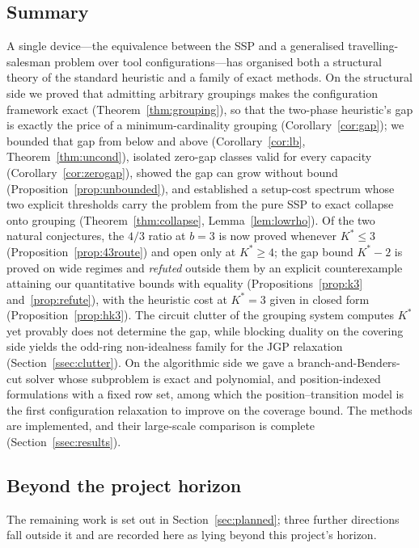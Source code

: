 \documentclass[11pt,a4paper]{article}
\theoremstyle{plain}
\theoremstyle{definition}
\theoremstyle{remark}
\newcommand{\Kst}{K^{\ast}}
\begin{document}
\subsection{Summary}
A single device---the equivalence between the SSP and a generalised
travelling-salesman problem over tool configurations---has organised both a
structural theory of the standard heuristic and a family of exact methods. On the
structural side we proved that admitting arbitrary groupings makes the configuration
framework exact (Theorem~\ref{thm:grouping}), so that the two-phase heuristic's gap is
exactly the price of a minimum-cardinality grouping (Corollary~\ref{cor:gap}); we
bounded that gap from below and above (Corollary~\ref{cor:lb},
Theorem~\ref{thm:uncond}), isolated zero-gap classes valid for every capacity
(Corollary~\ref{cor:zerogap}), showed the gap can grow without bound
(Proposition~\ref{prop:unbounded}), and established a setup-cost spectrum whose two
explicit thresholds carry the problem from the pure SSP to exact collapse onto
grouping (Theorem~\ref{thm:collapse}, Lemma~\ref{lem:lowrho}). Of the two natural conjectures,
the $4/3$ ratio at $b=3$ is now proved whenever $\Kst\le3$
(Proposition~\ref{prop:43route}) and open only at $\Kst\ge4$; the gap bound
$\Kst-2$ is proved on wide regimes and \emph{refuted} outside them by an explicit
counterexample attaining our quantitative bounds with equality
(Propositions~\ref{prop:k3} and~\ref{prop:refute}), with the heuristic cost at
$\Kst=3$ given in closed form (Proposition~\ref{prop:hk3}). The circuit clutter
of the grouping system computes $\Kst$ yet provably does not determine the gap,
while blocking duality on the covering side yields the odd-ring non-idealness
family for the JGP relaxation (Section~\ref{ssec:clutter}). On the algorithmic
side we gave a branch-and-Benders-cut solver whose subproblem is exact and
polynomial, and position-indexed formulations with a fixed row set, among which the
position--transition model is the first configuration relaxation to improve on the
coverage bound. The methods are implemented, and their large-scale comparison is
complete (Section~\ref{ssec:results}).

\subsection{Beyond the project horizon}
The remaining work is set out in Section~\ref{sec:planned}; three further
directions fall outside it and are recorded here as lying beyond this project's
horizon.
\end{document}
